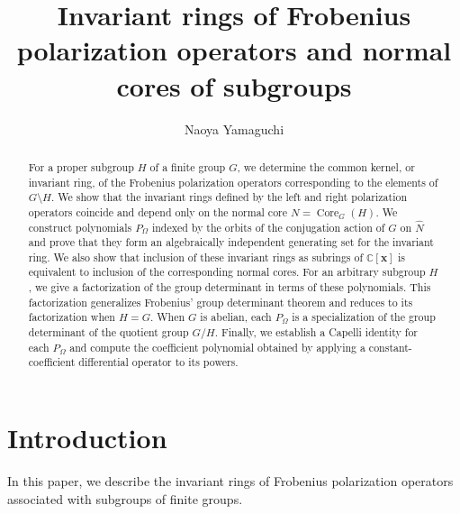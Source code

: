 \documentclass[12pt,a4paper]{article}
\theoremstyle{definition}
\numberwithin{definition}{section}
\DeclareMathOperator{\Core}{Core}
\begin{document}
\title{Invariant rings of Frobenius polarization operators and normal cores of subgroups}
\author{Naoya Yamaguchi}
\date{}
\maketitle

\begin{abstract}
For a proper subgroup $H$ of a finite group $G$, we determine the common kernel,
or invariant ring, of the Frobenius polarization operators corresponding to
the elements of $G\setminus H$.
We show that the invariant rings defined by the left and right polarization
operators coincide and depend only on the normal core $N=\Core_G(H)$.
We construct polynomials $P_\Omega$ indexed by the orbits of the conjugation
action of $G$ on $\widehat N$ and prove that they form an algebraically
independent generating set for the invariant ring.
We also show that inclusion of these invariant rings as subrings of
$\mathbb C[\bm x]$ is equivalent to inclusion of the corresponding normal cores.
For an arbitrary subgroup $H$, we give a factorization of the group determinant
in terms of these polynomials. This factorization generalizes Frobenius'
group determinant theorem and reduces to its factorization when $H=G$.
When $G$ is abelian, each $P_\Omega$ is a specialization of the group determinant
of the quotient group $G/H$.
Finally, we establish a Capelli identity for each $P_\Omega$ and compute the
coefficient polynomial obtained by applying a constant-coefficient differential
operator to its powers.
\end{abstract}

\section{Introduction}
In this paper, we describe the invariant rings of Frobenius polarization
operators associated with subgroups of finite groups.
\end{document}
